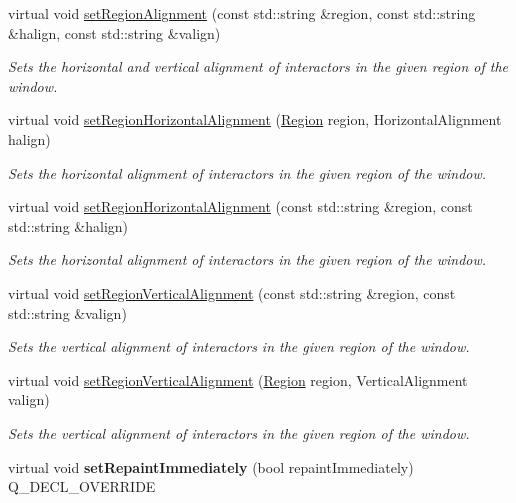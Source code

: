 \begin{DoxyCompactItemize}
virtual void \mbox{\hyperlink{classGWindow_ad1c76be81b3b865f78b0e91f0e1f07d4}{set\+Region\+Alignment}} (const std\+::string \&region, const std\+::string \&halign, const std\+::string \&valign)
\begin{DoxyCompactList}\small\item\em Sets the horizontal and vertical alignment of interactors in the given region of the window. \end{DoxyCompactList}\item 
virtual void \mbox{\hyperlink{classGWindow_aca8f01ef261afca9c843589e8be54134}{set\+Region\+Horizontal\+Alignment}} (\mbox{\hyperlink{classGWindow_a81a01a86de31071a92e6cce0bab9bc4b}{Region}} region, Horizontal\+Alignment halign)
\begin{DoxyCompactList}\small\item\em Sets the horizontal alignment of interactors in the given region of the window. \end{DoxyCompactList}\item 
virtual void \mbox{\hyperlink{classGWindow_aefb97090ff4e149f8a0cce9efee3c451}{set\+Region\+Horizontal\+Alignment}} (const std\+::string \&region, const std\+::string \&halign)
\begin{DoxyCompactList}\small\item\em Sets the horizontal alignment of interactors in the given region of the window. \end{DoxyCompactList}\item 
virtual void \mbox{\hyperlink{classGWindow_afbe22d897ce8ef25db52cbc3d456aa0a}{set\+Region\+Vertical\+Alignment}} (const std\+::string \&region, const std\+::string \&valign)
\begin{DoxyCompactList}\small\item\em Sets the vertical alignment of interactors in the given region of the window. \end{DoxyCompactList}\item 
virtual void \mbox{\hyperlink{classGWindow_a1efb2d3b67fb479aad27a6c0032ee70e}{set\+Region\+Vertical\+Alignment}} (\mbox{\hyperlink{classGWindow_a81a01a86de31071a92e6cce0bab9bc4b}{Region}} region, Vertical\+Alignment valign)
\begin{DoxyCompactList}\small\item\em Sets the vertical alignment of interactors in the given region of the window. \end{DoxyCompactList}\item 
virtual void {\bfseries set\+Repaint\+Immediately} (bool repaint\+Immediately) Q\+\_\+\+D\+E\+C\+L\+\_\+\+O\+V\+E\+R\+R\+I\+DE

\end{DoxyCompactItemize}
